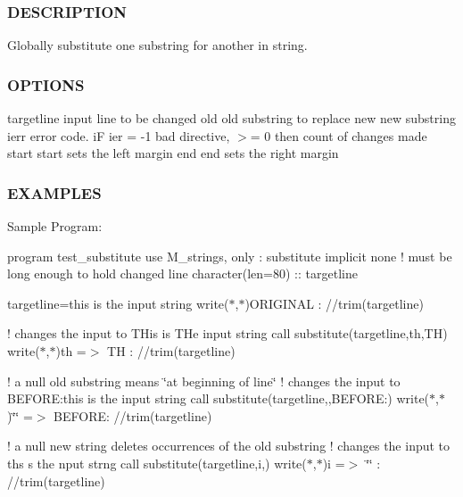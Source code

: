 \subsubsection*{D\+E\+S\+C\+R\+I\+P\+T\+I\+ON}

Globally substitute one substring for another in string.

\subsubsection*{O\+P\+T\+I\+O\+NS}

targetline input line to be changed old old substring to replace new new substring ierr error code. iF ier = -\/1 bad directive, $>$= 0 then count of changes made start start sets the left margin end end sets the right margin

\subsubsection*{E\+X\+A\+M\+P\+L\+ES}

Sample Program\+:

program test\+\_\+substitute use M\+\_\+strings, only \+: substitute implicit none ! must be long enough to hold changed line character(len=80) \+:\+: targetline

targetline=\textquotesingle{}this is the input string\textquotesingle{} write($\ast$,$\ast$)\textquotesingle{}O\+R\+I\+G\+I\+N\+AL \+: \textquotesingle{}//trim(targetline)

! changes the input to \textquotesingle{}T\+His is T\+He input string\textquotesingle{} call substitute(targetline,\textquotesingle{}th\textquotesingle{},\textquotesingle{}TH\textquotesingle{}) write($\ast$,$\ast$)\textquotesingle{}th =$>$ TH \+: \textquotesingle{}//trim(targetline)

! a null old substring means \char`\"{}at beginning of line\char`\"{} ! changes the input to \textquotesingle{}B\+E\+F\+O\+RE\+:this is the input string\textquotesingle{} call substitute(targetline,\textquotesingle{}\textquotesingle{},\textquotesingle{}B\+E\+F\+O\+RE\+:\textquotesingle{}) write($\ast$,$\ast$)\textquotesingle{}\char`\"{}\char`\"{} =$>$ B\+E\+F\+O\+RE\+: \textquotesingle{}//trim(targetline)

! a null new string deletes occurrences of the old substring ! changes the input to \textquotesingle{}ths s the nput strng\textquotesingle{} call substitute(targetline,\textquotesingle{}i\textquotesingle{},\textquotesingle{}\textquotesingle{}) write($\ast$,$\ast$)\textquotesingle{}i =$>$ \char`\"{}\char`\"{} \+: \textquotesingle{}//trim(targetline)

